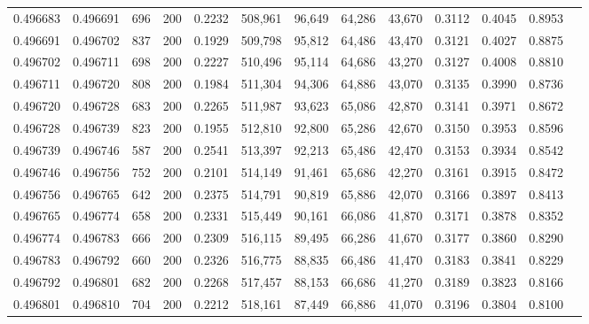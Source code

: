 \begin{tabular}{rrrrrrrrrrrrr}
0.496683 & 0.496691 &   696 & 200 &                                     0.2232 & 508,961 &  96,649 &  64,286 &  43,670 & 0.3112 & 0.4045 & 0.8953 \\
0.496691 & 0.496702 &   837 & 200 &                                     0.1929 & 509,798 &  95,812 &  64,486 &  43,470 & 0.3121 & 0.4027 & 0.8875 \\
0.496702 & 0.496711 &   698 & 200 &                                     0.2227 & 510,496 &  95,114 &  64,686 &  43,270 & 0.3127 & 0.4008 & 0.8810 \\
0.496711 & 0.496720 &   808 & 200 &                                     0.1984 & 511,304 &  94,306 &  64,886 &  43,070 & 0.3135 & 0.3990 & 0.8736 \\
0.496720 & 0.496728 &   683 & 200 &                                     0.2265 & 511,987 &  93,623 &  65,086 &  42,870 & 0.3141 & 0.3971 & 0.8672 \\
0.496728 & 0.496739 &   823 & 200 &                                     0.1955 & 512,810 &  92,800 &  65,286 &  42,670 & 0.3150 & 0.3953 & 0.8596 \\
0.496739 & 0.496746 &   587 & 200 &                                     0.2541 & 513,397 &  92,213 &  65,486 &  42,470 & 0.3153 & 0.3934 & 0.8542 \\
0.496746 & 0.496756 &   752 & 200 &                                     0.2101 & 514,149 &  91,461 &  65,686 &  42,270 & 0.3161 & 0.3915 & 0.8472 \\
0.496756 & 0.496765 &   642 & 200 &                                     0.2375 & 514,791 &  90,819 &  65,886 &  42,070 & 0.3166 & 0.3897 & 0.8413 \\
0.496765 & 0.496774 &   658 & 200 &                                     0.2331 & 515,449 &  90,161 &  66,086 &  41,870 & 0.3171 & 0.3878 & 0.8352 \\
0.496774 & 0.496783 &   666 & 200 &                                     0.2309 & 516,115 &  89,495 &  66,286 &  41,670 & 0.3177 & 0.3860 & 0.8290 \\
0.496783 & 0.496792 &   660 & 200 &                                     0.2326 & 516,775 &  88,835 &  66,486 &  41,470 & 0.3183 & 0.3841 & 0.8229 \\
0.496792 & 0.496801 &   682 & 200 &                                     0.2268 & 517,457 &  88,153 &  66,686 &  41,270 & 0.3189 & 0.3823 & 0.8166 \\
0.496801 & 0.496810 &   704 & 200 &                                     0.2212 & 518,161 &  87,449 &  66,886 &  41,070 & 0.3196 & 0.3804 & 0.8100 \\

\end{tabular}
